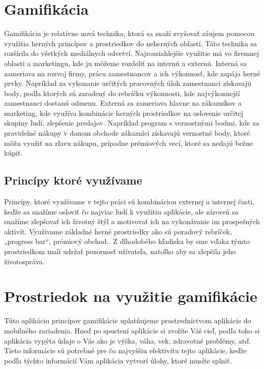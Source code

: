 \documentclass[10pt,twoside,slovak,a4paper]{article}
\begin{document}
\section{Gamifikácia} \label{Gamifikácia}

Gamifikácia je relatívne nová technika, ktorá sa snaží zvyšovať záujem pomocou využitia herných princípov a prostriedkov do neherných oblastí.\cite{Tóth:GamificationSA} Táto technika sa rozšírila do všetkých mediálnych odvetví. Najrozsiahlejšie využitie má vo firemnej oblasti a marketingu, kde ju môžeme rozdeliť na internú a externú. Interná sa zameriava na rozvoj firmy, prácu zamestnancov a ich výkonnosť, kde zapája herné prvky. Napríklad za vykonanie určitých pracovných úloh zamestnanci získavajú body, podľa ktorých sú zaradený do rebríčku výkonnosti, kde najvýkonnejší zamestnanci dostanú odmenu. Externá sa zameriava hlavne na zákazníkov a marketing, kde využíva kombinácie herných prostriedkov na oslovenie určitej skupiny ľudí, zlepšenie predajov. Napríklad program s vernostnými bodmi, kde za pravidelné nákupy v danom obchode zákazníci získavajú vernostné body, ktoré môžu využiť na zľavu nákupu, prípadne prémiových vecí, ktoré sa nedajú bežne kúpiť.  

\subsection {Princípy ktoré využívame}

Princípy, ktoré využívame v tejto práci sú kombináciou externej a internej časti, keďže sa snažíme osloviť čo najviac ľudí k využitiu aplikácie, ale zároveň sa snažíme zlepšovať ich životný štýl a motivovať ich na vykonávanie im prospešných aktivít. Využívame základné herné prostriedky ako sú poradový rebríček, „progress bar“, prémiový obchod.. Z dlhodobého hľadiska by sme vďaka týmto prostriedkom mali udržať pozornosť užívateľa, natoľko aby sa zlepšila jeho životospráva.
\label{Gamifikácia}


\section{Prostriedok na využitie gamifikácie} \label{Využitie gamifikácie}
Túto aplikáciu princípov gamifikácie uplatňujeme prostredníctvom aplikácie do mobilného zariadenia. Hneď po spustení aplikácie si zvolíte Váš cieľ, podľa toho si aplikácia vypýta údaje o Vás ako je výška, váha, vek, zdravotné problémy, atď. Tieto informácie sú potrebné pre čo najvyššiu efektivitu tejto aplikácie, keďže podľa týchto informácií Vám aplikácia vytvorí úlohy, ktoré musíte splniť. 
\end{document}
